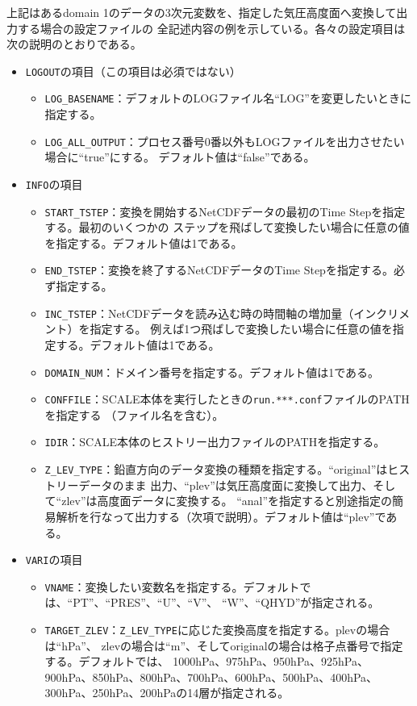 \noindent 上記はあるdomain 1のデータの3次元変数を、指定した気圧高度面へ変換して出力する場合の設定ファイルの
全記述内容の例を示している。各々の設定項目は次の説明のとおりである。
\begin{itemize}
 \item \verb|LOGOUT|の項目（この項目は必須ではない）
 \begin{itemize}
  \item \verb|LOG_BASENAME|：デフォルトのLOGファイル名``LOG''を変更したいときに指定する。
  \item \verb|LOG_ALL_OUTPUT|：プロセス番号0番以外もLOGファイルを出力させたい場合に``true''にする。
        デフォルト値は``false''である。
 \end{itemize}
 \item \verb|INFO|の項目
 \begin{itemize}
  \item \verb|START_TSTEP|：変換を開始するNetCDFデータの最初のTime Stepを指定する。最初のいくつかの
        ステップを飛ばして変換したい場合に任意の値を指定する。デフォルト値は1である。
  \item \verb|END_TSTEP|：変換を終了するNetCDFデータのTime Stepを指定する。必ず指定する。
  \item \verb|INC_TSTEP|：NetCDFデータを読み込む時の時間軸の増加量（インクリメント）を指定する。
        例えば1つ飛ばしで変換したい場合に任意の値を指定する。デフォルト値は1である。
  \item \verb|DOMAIN_NUM|：ドメイン番号を指定する。デフォルト値は1である。
  \item \verb|CONFFILE|：SCALE本体を実行したときの\verb|run.***.conf|ファイルのPATHを指定する
        （ファイル名を含む）。
  \item \verb|IDIR|：SCALE本体のヒストリー出力ファイルのPATHを指定する。
  \item \verb|Z_LEV_TYPE|：鉛直方向のデータ変換の種類を指定する。``original''はヒストリーデータのまま
        出力、``plev''は気圧高度面に変換して出力、そして``zlev''は高度面データに変換する。
        ``anal''を指定すると別途指定の簡易解析を行なって出力する（次項で説明）。デフォルト値は``plev''である。
 \end{itemize}
 \item \verb|VARI|の項目
 \begin{itemize}
  \item \verb|VNAME|：変換したい変数名を指定する。デフォルトでは、``PT''、``PRES''、``U''、``V''、
        ``W''、``QHYD''が指定される。
  \item \verb|TARGET_ZLEV|：\verb|Z_LEV_TYPE|に応じた変換高度を指定する。plevの場合は``hPa''、
        zlevの場合は``m''、そしてoriginalの場合は格子点番号で指定する。デフォルトでは、
        1000hPa、975hPa、950hPa、925hPa、900hPa、850hPa、800hPa、700hPa、600hPa、500hPa、400hPa、
        300hPa、250hPa、200hPaの14層が指定される。 
 \end{itemize}
\end{itemize}

